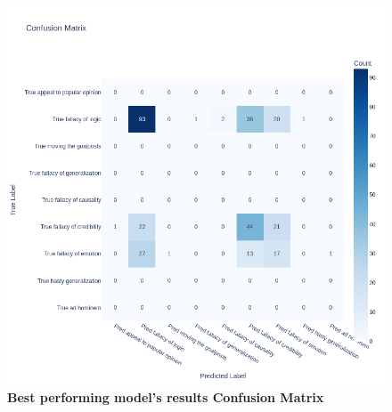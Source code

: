 \begin{figure}[H]
\centering
\includegraphics[width=\textwidth]{graphics/aristotle_confusion_matrix.png}
\caption{\textbf{Best performing model's results Confusion Matrix}}
\end{figure}

